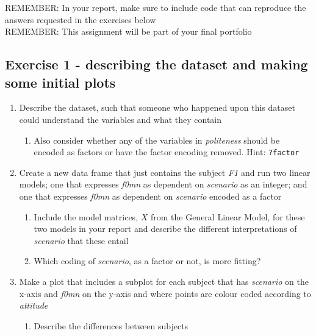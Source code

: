 \documentclass[
]{article}
\providecommand{\tightlist}{%
  \setlength{\itemsep}{0pt}\setlength{\parskip}{0pt}}
\begin{document}
REMEMBER: In your report, make sure to include code that can reproduce
the answers requested in the exercises below\\
REMEMBER: This assignment will be part of your final portfolio

\hypertarget{exercise-1---describing-the-dataset-and-making-some-initial-plots}{%
\subsection{Exercise 1 - describing the dataset and making some initial
plots}\label{exercise-1---describing-the-dataset-and-making-some-initial-plots}}

\begin{enumerate}
\def\labelenumi{\arabic{enumi})}
\tightlist
\item
  Describe the dataset, such that someone who happened upon this dataset
  could understand the variables and what they contain

  \begin{enumerate}
  \def\labelenumii{\roman{enumii}.}
  \tightlist
  \item
    Also consider whether any of the variables in \emph{politeness}
    should be encoded as factors or have the factor encoding removed.
    Hint: \texttt{?factor}\\
  \end{enumerate}
\item
  Create a new data frame that just contains the subject \emph{F1} and
  run two linear models; one that expresses \emph{f0mn} as dependent on
  \emph{scenario} as an integer; and one that expresses \emph{f0mn} as
  dependent on \emph{scenario} encoded as a factor

  \begin{enumerate}
  \def\labelenumii{\roman{enumii}.}
  \tightlist
  \item
    Include the model matrices, \(X\) from the General Linear Model, for
    these two models in your report and describe the different
    interpretations of \emph{scenario} that these entail
  \item
    Which coding of \emph{scenario}, as a factor or not, is more
    fitting?
  \end{enumerate}
\item
  Make a plot that includes a subplot for each subject that has
  \emph{scenario} on the x-axis and \emph{f0mn} on the y-axis and where
  points are colour coded according to \emph{attitude}

  \begin{enumerate}
  \def\labelenumii{\roman{enumii}.}
  \tightlist
  \item
    Describe the differences between subjects
  \end{enumerate}
\end{enumerate}
\end{document}
